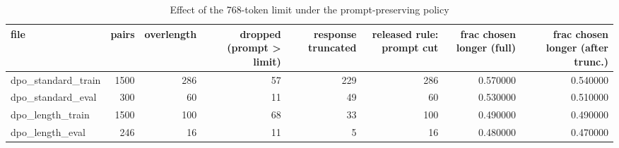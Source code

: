 \begin{table}
\caption{Effect of the 768-token limit under the prompt-preserving policy}
\label{tab:t1_truncation_policy}
\begin{tabular}{lrrrrrrr}
\toprule
file & pairs & overlength & dropped (prompt > limit) & response truncated & released rule: prompt cut & frac chosen longer (full) & frac chosen longer (after trunc.) \\
\midrule
dpo\_standard\_train & 1500 & 286 & 57 & 229 & 286 & 0.570000 & 0.540000 \\
dpo\_standard\_eval & 300 & 60 & 11 & 49 & 60 & 0.530000 & 0.510000 \\
dpo\_length\_train & 1500 & 100 & 68 & 33 & 100 & 0.490000 & 0.490000 \\
dpo\_length\_eval & 246 & 16 & 11 & 5 & 16 & 0.480000 & 0.470000 \\
\bottomrule
\end{tabular}
\end{table}
